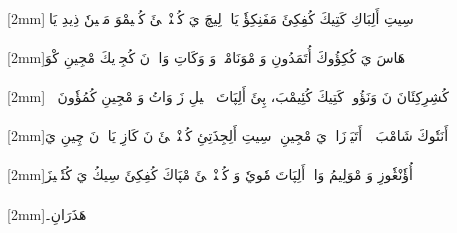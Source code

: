 \documentclass[a4paper, 12pt]{report}
\begin{document}
\begin{flushright}
\Tr{} \\ 

{\scriptsize{}[2mm]}\textarabic{سِيتِ أَلِبَاكِ كَتِيكَ كُفِكِئَ مَفَنِكِؤٗ يَاكٖ لِيچَ يَ كُئٖنْدٖلٖئَ كُسٖيمْوَ مَنٖينٗ ذِيدِ يَاكٖ} \\ 

 \\ 

{\scriptsize{}[2mm]}\textarabic{هَاسَ يَ كُكِؤُوكَ أُتَمَدُونِ وَ مْوَنَامْكٖ وَ وَكَاتِ وَاكٖ نَ كُجِوٖيكَ مْجِينِ كْوَ} \\ 

 \\ 

{\scriptsize{}[2mm]}\textarabic{كُشِرِكِئَانَ نَ وَنَؤُومٖ كَتِيكَ كُئِيمْبَ، پِئَ أَلِپَاتَ كٖجٖيلِ زَ وَاتُ وَ مْجِينِ كُمُؤٗونَ يٖيٖ} \\ 

 \\ 

{\scriptsize{}[2mm]}\textarabic{أَنَتٗوكَ شَامْبَ ؍ أَتَيَوٖزَاجٖ يَ مْجِينِ۔ سِيتِ أَلِجِذَتِئِ كُئٖنْدٖلٖئَ نَ كَازِ يَاكٖ نَ چِينِ يَ} \\ 

 \\ 

{\scriptsize{}[2mm]}\textarabic{أُؤٗنْڠٗوزِ وَ مْوَلِيمُ وَاكٖ أَلِپَاتَ مٗويٗ وَ كُئٖنْدٖلٖئَ مْپَاكَ كُفِكِئَ سِيكُ يَ كُتٗكٖيزَ} \\ 

 \\ 

{\scriptsize{}[2mm]}\textarabic{هَذَرَانِ۔} \\ 

 \\ 

\end{flushright}
\end{document}
